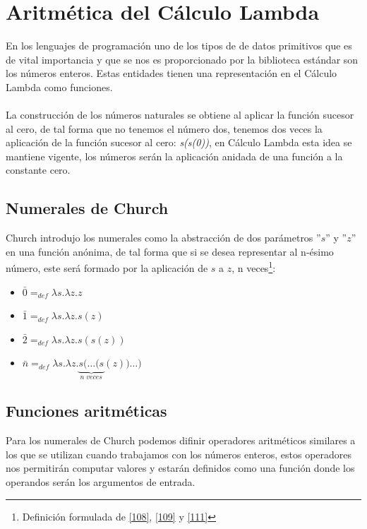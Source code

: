      \section{Aritmética del Cálculo Lambda}
        En los lenguajes de programación uno de los tipos de de datos primitivos que es de vital importancia y que se nos es proporcionado por la biblioteca estándar son los números enteros.
        Estas entidades tienen una representación en el Cálculo Lambda como funciones.\\\\
        La construcción de los números naturales se obtiene al aplicar la función sucesor al cero, de tal forma que no tenemos el número dos, tenemos dos veces la aplicación de la función sucesor al cero: \textit{s(s(0))}, en Cálculo Lambda esta idea se mantiene vigente, los números serán la aplicación anidada de una función a la constante cero. 
     \subsection{Numerales de Church}
        Church introdujo los numerales como la abstracción de dos parámetros ''$s$'' y ''$z$'' en una función anónima, de tal forma que si se desea representar al n-ésimo número, este será formado por la aplicación de $s$ a $z$, n veces\footnote{Definición formulada de \hyperlink{108}{[108]},  \hyperlink{109}{[109]} y  \hyperlink{111}{[111]}}:

    \begin{itemize}
        \item $\bar{0}=_{def}\lambda s.\lambda z.z$
        \item $\bar{1}=_{def}\lambda s.\lambda z.s(z)$
        \item $\bar{2}=_{def}\lambda s.\lambda z.s(s(z))$
        \item $\bar{n}=_{def}\lambda s.\lambda z.\underbrace{s(\ldots(s}_{n\;veces} (z))\ldots)$
    \end{itemize}

    \subsection{Funciones aritméticas}
		Para los numerales de Church podemos difinir operadores aritméticos similares a los que se utilizan cuando trabajamos con los números enteros, estos operadores nos permitirán computar valores y estarán definidos como una función donde los operandos serán los argumentos de entrada.

